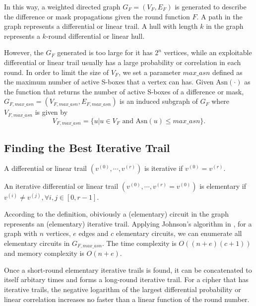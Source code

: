 In this way, a weighted directed graph $G_{F}=(V_{F},E_{F})$ is generated to describe the difference or mask propagations given the round function $F$. A path in the graph represents a differential or linear trail. A hull with length $k$ in the graph represents a $k$-round differential or linear hull. 

However, the $G_F$ generated is too large for it has $2^n$ vertices, while an exploitable differential or linear trail usually has a large probability or correlation in each round. In order to limit the size of $V_F$, we set a parameter $max\_asn$ defined as the maximum number of active S-boxes that a vertex can has. Given $\text{Asn}(\cdot)$ as the function that returns the number of active S-boxes of a difference or mask, $G_{F,max\_asn}=(V_{F,max\_asn},E_{F,max\_asn})$ is an induced subgraph of $G_F$ where $V_{F,max\_asn}$ is given by
\[
    V_{F,max\_asn}=\{u|u\in V_F \text{ and } \text{Asn}(u)\leq max\_asn\}.
\]

\subsection{Finding the Best Iterative Trail}\label{sec:fbit}

\begin{definition}\label{def:it}
	A differential or linear trail $(v^{(0)},\cdots,v^{(r)})$ is iterative if $v^{(0)}=v^{(r)}$.
\end{definition}

\begin{definition}
    An iterative differential or linear trail $(v^{(0)},\cdots,v^{(r)}=v^{(0)})$ is elementary if $v^{(i)}\neq v^{(j)},\forall i,j\in [0,r-1]$.
\end{definition}

According to the definition, obiviously a (elementary) circuit in the graph represents an (elementary) iterative trail. Applying Johnson's algorithm in \cite{J75}, for a graph with $n$ vertices, $e$ edges and $c$ elementary circuits, we can enumerate all elementary circuits in $G_{F,max\_asn}$. The time complexity is $O((n + e)(c + 1))$ and memory complexity is $O(n + e)$.

Once a short-round elementary iterative trails is found, it can be concatenated to itself arbitary times and forms a long-round iterative trail. For a cipher that has iterative trails, the negative logarithm of the largest differential probability or linear correlation increases no faster than a linear function of the round number. 

